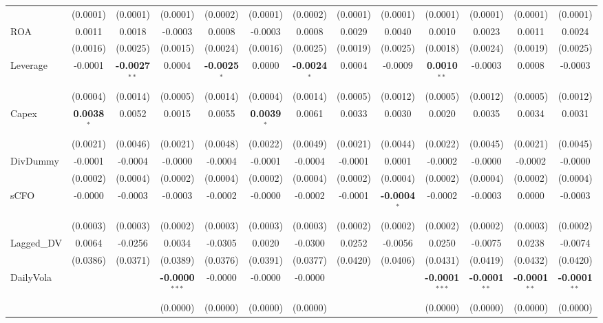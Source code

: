 \documentclass[11pt,a4paper]{article}
\begin{document}
\begin{table}[htbp]
\begin{tabular}{lcccccccccccc}
 & (0.0001) & (0.0001) & (0.0001) & (0.0002) & (0.0001) & (0.0002) & (0.0001) & (0.0001) & (0.0001) & (0.0001) & (0.0001) & (0.0001) \\
ROA & 0.0011 & 0.0018 & -0.0003 & 0.0008 & -0.0003 & 0.0008 & 0.0029 & 0.0040 & 0.0010 & 0.0023 & 0.0011 & 0.0024 \\
 & (0.0016) & (0.0025) & (0.0015) & (0.0024) & (0.0016) & (0.0025) & (0.0019) & (0.0025) & (0.0018) & (0.0024) & (0.0019) & (0.0025) \\
Leverage & -0.0001 & \textbf{-0.0027}$^{**}$ & 0.0004 & \textbf{-0.0025}$^{*}$ & 0.0000 & \textbf{-0.0024}$^{*}$ & 0.0004 & -0.0009 & \textbf{0.0010}$^{**}$ & -0.0003 & 0.0008 & -0.0003 \\
 & (0.0004) & (0.0014) & (0.0005) & (0.0014) & (0.0004) & (0.0014) & (0.0005) & (0.0012) & (0.0005) & (0.0012) & (0.0005) & (0.0012) \\
Capex & \textbf{0.0038}$^{*}$ & 0.0052 & 0.0015 & 0.0055 & \textbf{0.0039}$^{*}$ & 0.0061 & 0.0033 & 0.0030 & 0.0020 & 0.0035 & 0.0034 & 0.0031 \\
 & (0.0021) & (0.0046) & (0.0021) & (0.0048) & (0.0022) & (0.0049) & (0.0021) & (0.0044) & (0.0022) & (0.0045) & (0.0021) & (0.0045) \\
DivDummy & -0.0001 & -0.0004 & -0.0000 & -0.0004 & -0.0001 & -0.0004 & -0.0001 & 0.0001 & -0.0002 & -0.0000 & -0.0002 & -0.0000 \\
 & (0.0002) & (0.0004) & (0.0002) & (0.0004) & (0.0002) & (0.0004) & (0.0002) & (0.0004) & (0.0002) & (0.0004) & (0.0002) & (0.0004) \\
sCFO & -0.0000 & -0.0003 & -0.0003 & -0.0002 & -0.0000 & -0.0002 & -0.0001 & \textbf{-0.0004}$^{*}$ & -0.0002 & -0.0003 & 0.0000 & -0.0003 \\
 & (0.0003) & (0.0003) & (0.0002) & (0.0003) & (0.0003) & (0.0003) & (0.0002) & (0.0002) & (0.0002) & (0.0002) & (0.0003) & (0.0002) \\
Lagged\_DV & 0.0064 & -0.0256 & 0.0034 & -0.0305 & 0.0020 & -0.0300 & 0.0252 & -0.0056 & 0.0250 & -0.0075 & 0.0238 & -0.0074 \\
 & (0.0386) & (0.0371) & (0.0389) & (0.0376) & (0.0391) & (0.0377) & (0.0420) & (0.0406) & (0.0431) & (0.0419) & (0.0432) & (0.0420) \\
DailyVola &  &  & \textbf{-0.0000}$^{***}$ & -0.0000 & -0.0000 & -0.0000 &  &  & \textbf{-0.0001}$^{***}$ & \textbf{-0.0001}$^{**}$ & \textbf{-0.0001}$^{**}$ & \textbf{-0.0001}$^{**}$ \\
 &  &  & (0.0000) & (0.0000) & (0.0000) & (0.0000) &  &  & (0.0000) & (0.0000) & (0.0000) & (0.0000) \\

\end{tabular}
\end{table}
\end{document}
